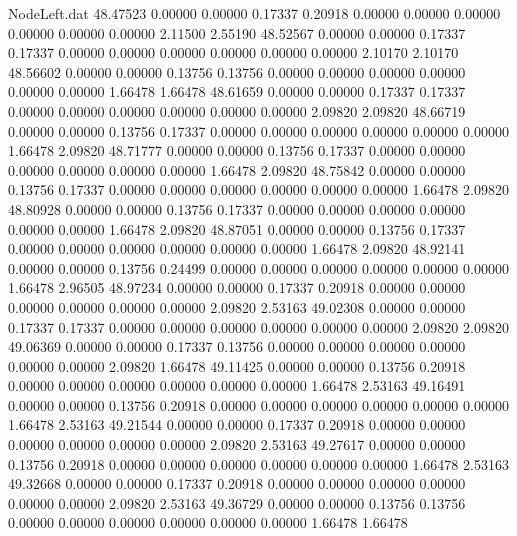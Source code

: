 \begin{filecontents}{NodeLeft.dat}
  48.47523    0.00000    0.00000     0.17337    0.20918    0.00000    0.00000    0.00000    0.00000    0.00000    0.00000    2.11500    2.55190
  48.52567    0.00000    0.00000     0.17337    0.17337    0.00000    0.00000    0.00000    0.00000    0.00000    0.00000    2.10170    2.10170
  48.56602    0.00000    0.00000     0.13756    0.13756    0.00000    0.00000    0.00000    0.00000    0.00000    0.00000    1.66478    1.66478
  48.61659    0.00000    0.00000     0.17337    0.17337    0.00000    0.00000    0.00000    0.00000    0.00000    0.00000    2.09820    2.09820
  48.66719    0.00000    0.00000     0.13756    0.17337    0.00000    0.00000    0.00000    0.00000    0.00000    0.00000    1.66478    2.09820
  48.71777    0.00000    0.00000     0.13756    0.17337    0.00000    0.00000    0.00000    0.00000    0.00000    0.00000    1.66478    2.09820
  48.75842    0.00000    0.00000     0.13756    0.17337    0.00000    0.00000    0.00000    0.00000    0.00000    0.00000    1.66478    2.09820
  48.80928    0.00000    0.00000     0.13756    0.17337    0.00000    0.00000    0.00000    0.00000    0.00000    0.00000    1.66478    2.09820
  48.87051    0.00000    0.00000     0.13756    0.17337    0.00000    0.00000    0.00000    0.00000    0.00000    0.00000    1.66478    2.09820
  48.92141    0.00000    0.00000     0.13756    0.24499    0.00000    0.00000    0.00000    0.00000    0.00000    0.00000    1.66478    2.96505
  48.97234    0.00000    0.00000     0.17337    0.20918    0.00000    0.00000    0.00000    0.00000    0.00000    0.00000    2.09820    2.53163
  49.02308    0.00000    0.00000     0.17337    0.17337    0.00000    0.00000    0.00000    0.00000    0.00000    0.00000    2.09820    2.09820
  49.06369    0.00000    0.00000     0.17337    0.13756    0.00000    0.00000    0.00000    0.00000    0.00000    0.00000    2.09820    1.66478
  49.11425    0.00000    0.00000     0.13756    0.20918    0.00000    0.00000    0.00000    0.00000    0.00000    0.00000    1.66478    2.53163
  49.16491    0.00000    0.00000     0.13756    0.20918    0.00000    0.00000    0.00000    0.00000    0.00000    0.00000    1.66478    2.53163
  49.21544    0.00000    0.00000     0.17337    0.20918    0.00000    0.00000    0.00000    0.00000    0.00000    0.00000    2.09820    2.53163
  49.27617    0.00000    0.00000     0.13756    0.20918    0.00000    0.00000    0.00000    0.00000    0.00000    0.00000    1.66478    2.53163
  49.32668    0.00000    0.00000     0.17337    0.20918    0.00000    0.00000    0.00000    0.00000    0.00000    0.00000    2.09820    2.53163
  49.36729    0.00000    0.00000     0.13756    0.13756    0.00000    0.00000    0.00000    0.00000    0.00000    0.00000    1.66478    1.66478

\end{filecontents}
